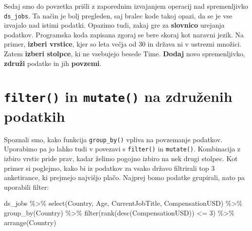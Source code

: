 \documentclass[
]{book}
\newenvironment{Shaded}{\begin{snugshade}}{\end{snugshade}}
\newcommand{\DecValTok}[1]{\textcolor[rgb]{0.00,0.00,0.81}{#1}}
\newcommand{\FunctionTok}[1]{\textcolor[rgb]{0.00,0.00,0.00}{#1}}
\newcommand{\NormalTok}[1]{#1}
\newcommand{\SpecialCharTok}[1]{\textcolor[rgb]{0.00,0.00,0.00}{#1}}
\begin{document}
Sedaj smo do povzetka prišli z zaporednim izvajanjem operacij nad spremenljivko \texttt{ds\_jobs}. Ta način je bolj pregleden, saj bralec kode takoj opazi, da se je vse izvajalo nad istimi podatki. Opazimo tudi, zakaj gre za \textbf{slovnico} urejanja podatkov. Programska koda zapisana zgoraj se bere skoraj kot naravni jezik. Na primer, \textbf{izberi vrstice}, kjer so leta večja od 30 in država ni v ustrezni množici. Zatem \textbf{izberi stolpce}, ki ne vsebujejo besede Time. \textbf{Dodaj} novo spremenljivko, \textbf{združi} podatke in jih \textbf{povzemi}.

\hypertarget{filter-in-mutate-na-zdruux17eenih-podatkih}{%
\section{\texorpdfstring{\texttt{filter()} in \texttt{mutate()} na združenih podatkih}{filter() in mutate() na združenih podatkih}}\label{filter-in-mutate-na-zdruux17eenih-podatkih}}

Spoznali smo, kako funkcija \texttt{group\_by()} vpliva na povzemanje podatkov. Uporabimo pa jo lahko tudi v povezavi s \texttt{filter()} in \texttt{mutate()}. Kombinacija z izbiro vrstic pride prav, kadar želimo pogojno izbiro na nek drugi stolpec. Kot primer si poglejmo, kako bi iz podatkov za vsako državo filtrirali top 3 anketirance, ki prejmejo najvišjo plačo. Najprej bomo podatke grupirali, nato pa uporabili filter:

\begin{Shaded}
\begin{Highlighting}[]
\NormalTok{ds\_jobs }\SpecialCharTok{\%\textgreater{}\%}
  \FunctionTok{select}\NormalTok{(Country, Age, CurrentJobTitle, CompensationUSD) }\SpecialCharTok{\%\textgreater{}\%}
  \FunctionTok{group\_by}\NormalTok{(Country) }\SpecialCharTok{\%\textgreater{}\%}
  \FunctionTok{filter}\NormalTok{(}\FunctionTok{rank}\NormalTok{(}\FunctionTok{desc}\NormalTok{(CompensationUSD)) }\SpecialCharTok{\textless{}=} \DecValTok{3}\NormalTok{) }\SpecialCharTok{\%\textgreater{}\%}
  \FunctionTok{arrange}\NormalTok{(Country)}
\end{Highlighting}
\end{Shaded}
\end{document}

